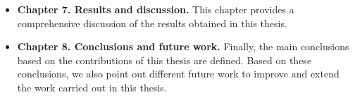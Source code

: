 \begin{itemize}
\item \textbf{Chapter 7. Results and discussion.} This chapter provides a comprehensive discussion of the results obtained in this thesis.
\item \textbf{Chapter 8. Conclusions and future work.} Finally, the main conclusions based on the contributions of this thesis are defined. Based on these conclusions, we  also point out different future work to improve and extend the work carried out in this thesis.   
\end{itemize}


